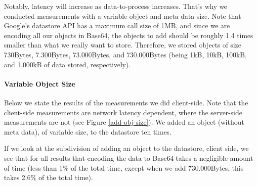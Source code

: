 Notably, latency will increase as data-to-process increases. That's why we
conducted measurements with a variable object and meta data size. Note that
Google's datastore API has a maximum call size of 1MB, and since we are
encoding all our objects in Base64, the objects to add should be roughly 1.4
times smaller than what we really want to store. Therefore, we stored objects 
of size 730Bytes, 7.300Bytes, 73.000Bytes, and 730.000Bytes (being 1kB, 10kB,
100kB, and 1.000kB of data stored, respectively).

\paragraph{Variable Object Size}
Below we state the results of the measurements we did client-side. Note that
the client-side measurements are network latency dependent, where the
server-side measurements are not (see Figure \ref{add-obj-size}). We added an
object (without meta data), of variable size, to the datastore ten times.

If we look at the subdivision of adding an object to the datastore, client
side, we see that for all results that encoding the data to Base64 takes a
negligible amount of time (less than 1\% of the total time, except when we add
730.000Bytes, this takes 2.6\% of the total time). 


